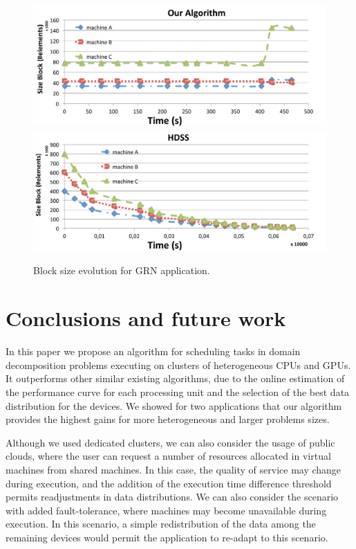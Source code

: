 \documentclass[journal]{IEEEtran}
\begin{document}
\begin{figure}[htb]
	\begin{center}
	\centering
			\includegraphics[scale=0.33]{Block_Comportamento_Nosso.pdf}\quad
			\includegraphics[scale=0.33]{Block_Comportamento_Deles.pdf}
	\caption{Block size evolution for GRN application.}
	\label{fig:GeneBlocos}
	\end{center}
\end{figure}


\section{Conclusions and future work}

In this paper we propose an algorithm for scheduling tasks in domain
decomposition problems executing on clusters of heterogeneous CPUs and GPUs. It
outperforms other similar existing algorithms, due to the online estimation of
the performance curve for each processing unit and the selection of the best
data distribution for the devices. We showed for two applications that our
algorithm provides the highest gains for more heterogeneous and larger problems
sizes.

Although we used dedicated clusters, we can also consider the usage of public
clouds, where the user can request a number of resources allocated in virtual
machines from shared machines. In this case, the quality of service may change
during execution, and the addition of the execution time difference threshold
permits readjustments in data distributions. We can also consider the scenario
with added fault-tolerance, where machines may become unavailable during
execution. In this scenario, a simple redistribution of the data among the
remaining devices would permit the application to re-adapt to this scenario.
\end{document}
